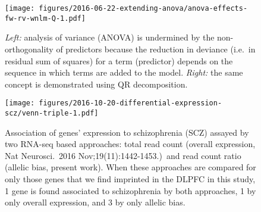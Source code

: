 \documentclass[12pt,letterpaper]{article}
\begin{document}
\begin{figure}[h]
\begin{center}
\texttt{[image: figures/2016-06-22-extending-anova/anova-effects-fw-rv-wnlm-Q-1.pdf]}
\end{center}
\caption{
\emph{Left:} analysis of variance (ANOVA) is undermined by the non-orthogonality of
predictors because the reduction in deviance (i.e.~in residual sum of squares)
for a term (predictor) depends on the sequence in which terms are added to the
model.  \emph{Right:} the same concept is demonstrated using QR decomposition.
}
\label{fig:anova}
\end{figure}

\begin{figure}[h]
\begin{center}
\texttt{[image: figures/2016-10-20-differential-expression-scz/venn-triple-1.pdf]}
\end{center}
\caption{
Association of genes' expression to schizophrenia (SCZ) assayed by two RNA-seq
based approaches: total read count (overall expression, Nat Neurosci.~2016
Nov;19(11):1442-1453.)~and read count ratio
(allelic bias, present work).  When these approaches are compared for only
those genes that we find imprinted in the DLPFC in this study, 1 gene is found
associated to schizophrenia by both approaches, 1 by only overall expression,
and 3 by only allelic bias.
}
\label{fig:diff-exp-scz}
\end{figure}

\end{document}
